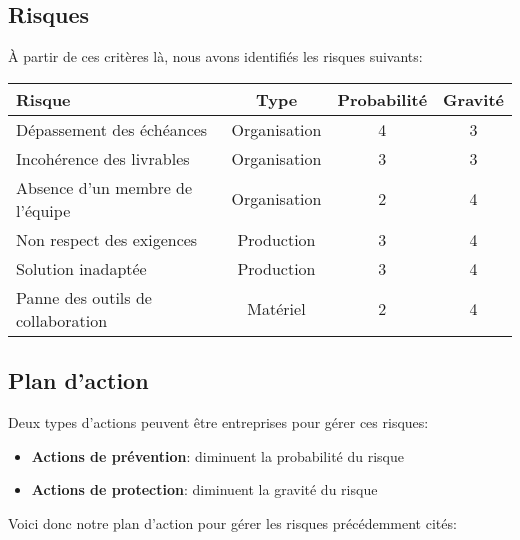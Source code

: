 \newpage

\subsection*{Risques}

À partir de ces critères là, nous avons identifiés les risques suivants:

\begin{tabular}{|l||c|c|c|}
   \hline	
	   \textbf{Risque} & \textbf{Type} & \textbf{Probabilité} & \textbf{Gravité} \\ \hline \hline
	   Dépassement des échéances         & Organisation & 4 & 3  \\ \hline
	   Incohérence des livrables         & Organisation & 3 & 3  \\ \hline
  	 Absence d'un membre de l'équipe   & Organisation & 2 & 4  \\ \hline
	   Non respect des exigences         & Production   & 3 & 4  \\ \hline
	   Solution inadaptée                & Production   & 3 & 4  \\ \hline
	   Panne des outils de collaboration & Matériel     & 2 & 4  \\
   \hline
\end{tabular}

\subsection*{Plan d'action}

Deux types d'actions peuvent être entreprises pour gérer ces risques:

\begin{itemize}
  \item \textbf{Actions de prévention}: diminuent la probabilité du risque
  \item \textbf{Actions de protection}: diminuent la gravité du risque
\end{itemize}

Voici donc notre plan d'action pour gérer les risques précédemment cités:

